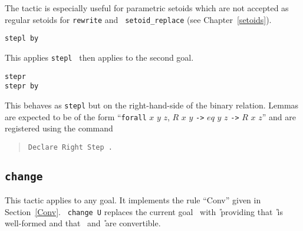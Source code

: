 \begin{coq_example*}
The tactic is especially useful for parametric setoids which are not
accepted as regular setoids for {\tt rewrite} and {\tt
  setoid\_replace} (see Chapter~\ref{setoids}).

\begin{Variants}
\item{\tt stepl {\term} by {\tac}}

This applies {\tt stepl {\term}} then applies {\tac} to the second goal.

\item{\tt stepr {\term}}\\
     {\tt stepr {\term} by {\tac}}

This behaves as {\tt stepl} but on the right-hand-side of the binary relation.
Lemmas are expected to be of the form
``{\tt forall} $x$ $y$
$z$, $R$ $x$ $y$ {\tt ->} $eq$ $y$ $z$ {\tt ->} $R$ $x$ $z$''
and are registered using the command
\begin{quote}
{\tt Declare Right Step {\term}.}
\end{quote}
\end{Variants}

\subsection{\tt change \term}
\label{change}

This tactic applies to any goal. It implements the rule
``Conv'' given in Section~\ref{Conv}.  {\tt
  change U} replaces the current goal \T\ with \U\ providing that
\U\ is well-formed and that \T\ and \U\ are convertible.

\begin{ErrMsgs}
\item {}
\end{ErrMsgs}

\end{coq_example*}
